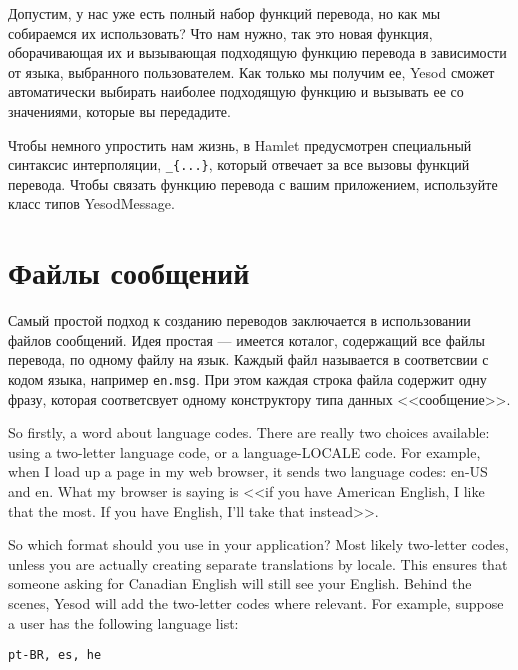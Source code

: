 Допустим, у нас уже есть полный набор функций перевода, но как мы собираемся их использовать? Что нам нужно, так это новая функция, оборачивающая их и вызывающая подходящую функцию перевода в зависимости от языка, выбранного пользователем. Как только мы получим ее, Yesod сможет автоматически выбирать наиболее подходящую функцию и вызывать ее со значениями, которые вы передадите.

Чтобы немного упростить нам жизнь, в Hamlet предусмотрен специальный синтаксис интерполяции, \lstinline'_{...}', который отвечает за все вызовы функций перевода. Чтобы связать функцию перевода с вашим приложением, используйте класс типов YesodMessage.

\section{Файлы сообщений} %

Самый простой подход к созданию переводов заключается в использовании файлов сообщений. Идея простая --- имеется коталог, содержащий все файлы перевода, по одному файлу на язык. Каждый файл называется в соответсвии с кодом языка, например \lstinline'en.msg'. При этом каждая строка файла содержит одну фразу, которая соответсвует одному конструктору типа данных <<сообщение>>.


So firstly, a word about language codes. There are really two choices available: using a two-letter language code, or a language-LOCALE code. For example, when I load up a page in my web browser, it sends two language codes: en-US and en. What my browser is saying is <<if you have American English, I like that the most. If you have English, I'll take that instead>>.

So which format should you use in your application? Most likely two-letter codes, unless you are actually creating separate translations by locale. This ensures that someone asking for Canadian English will still see your English. Behind the scenes, Yesod will add the two-letter codes where relevant. For example, suppose a user has the following language list:

\begin{lstlisting}
pt-BR, es, he
\end{lstlisting}


